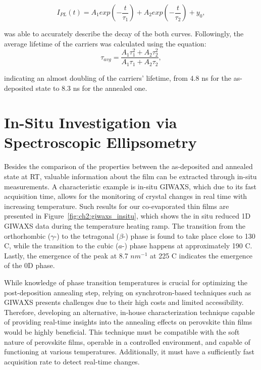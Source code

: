 \begin{equation}
    I_{PL}(t) = A_1exp(-\frac{t}{\tau_1}) + A_2exp(-\frac{t}{\tau_2}) + y_0,
\end{equation}

was able to accurately describe the decay of the both curves. Followingly, the average lifetime of the carriers was calculated using the equation: 
\begin{equation}
    \tau_{avg} = \frac{A_1 \tau_1^2 + A_2 \tau_2^2}{A_1 \tau_1 + A_2 \tau_2},
\end{equation}

indicating an almost doubling of the carriers' lifetime, from 4.8 ns for the as-deposited state to 8.3 ns for the annealed one.



\section{In-Situ Investigation via Spectroscopic Ellipsometry} \label{sec:in_situ}

Besides the comparison of the properties between the as-deposited and annealed state at RT, valuable information about the film can be extracted through in-situ measurements. A characteristic example is in-situ GIWAXS, which due to its fast acquisition time, allows for the monitoring of crystal changes in real time with increasing temperature. Such results for our co-evaporated  thin films are presented in Figure~\ref{fig:ch2:giwaxs_insitu}, which shows the in situ reduced 1D GIWAXS data during the temperature heating ramp. The transition from the orthorhombic ($\gamma$-) to the tetragonal ($\beta$-) phase is found to take place close to 130 \degree C, while the transition to the cubic ($a$-) phase happens at approximately 190 \degree C. Lastly, the emergence of the peak at 8.7 $nm^{-1}$ at 225 \degree C indicates the emergence of the 0D  phase. 


While knowledge of phase transition temperatures is crucial for optimizing the post-deposition annealing step, relying on synchrotron-based techniques such as GIWAXS presents challenges due to their high costs and limited accessibility. Therefore, developing an alternative, in-house characterization technique capable of providing real-time insights into the annealing effects on perovskite thin films would be highly beneficial. This technique must be compatible with the soft nature of perovskite films, operable in a controlled environment, and capable of functioning at various temperatures. Additionally, it must have a sufficiently fast acquisition rate to detect real-time changes.


